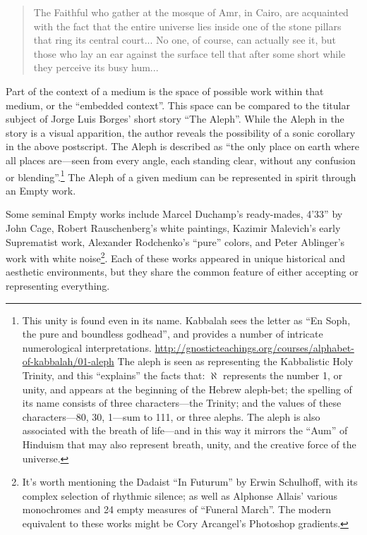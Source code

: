 \documentclass{thesis}
\begin{document}
	\begin{quote}
	The Faithful who gather at the mosque of Amr, in Cairo, are acquainted with the fact that the entire universe lies inside one of the stone pillars that ring its central court... No one, of course, can actually see it, but those who lay an ear against the surface tell that after some short while they perceive its busy hum...
	\end{quote}

Part of the context of a medium is the space of possible work within that medium, or the ``embedded context''. This space can be compared to the titular subject of Jorge Luis Borges' short story ``The Aleph''\cite{borges_aleph_2004}. While the Aleph in the story is a visual apparition, the author reveals the possibility of a sonic corollary in the above postscript. The Aleph is described as ``the only place on earth where all places are---seen from every angle, each standing clear, without any confusion or blending''.\footnote{This unity is found even in its name. Kabbalah sees the letter as ``En Soph, the pure and boundless godhead'', and provides a number of intricate numerological interpretations. \url{http://gnosticteachings.org/courses/alphabet-of-kabbalah/01-aleph} The aleph is seen as representing the Kabbalistic Holy Trinity, and this ``explains'' the facts that: $\aleph$ represents the number 1, or unity, and appears at the beginning of the Hebrew aleph-bet; the spelling of its name consists of three characters---the Trinity; and the values of these characters---80, 30, 1---sum to 111, or three alephs. The aleph is also associated with the breath of life---and in this way it mirrors the ``Aum'' of Hinduism that may also represent breath, unity, and the creative force of the universe.} The Aleph of a given medium can be represented in spirit through an Empty work.

Some seminal Empty works include Marcel Duchamp's ready-mades, 4'33'' by John Cage\cite{larry_j_solomon_sounds_1998}, Robert Rauschenberg's white paintings, Kazimir Malevich's early Suprematist work\cite{moma_kazimir_2006}, Alexander Rodchenko's ``pure'' colors\cite{moma_rodchenko_1998}, and Peter Ablinger's work with white noise\footnote{It's worth mentioning the Dadaist ``In Futurum'' by   Erwin Schulhoff, with its complex selection of rhythmic silence; as well as Alphonse Allais' various monochromes and 24 empty measures of ``Funeral March''. The modern equivalent to these works might be Cory Arcangel's Photoshop gradients.\cite{cory_arcangel_photoshop_2009}}. Each of these works appeared in unique historical and aesthetic environments, but they share the common feature of either accepting or representing everything.
\end{document}

